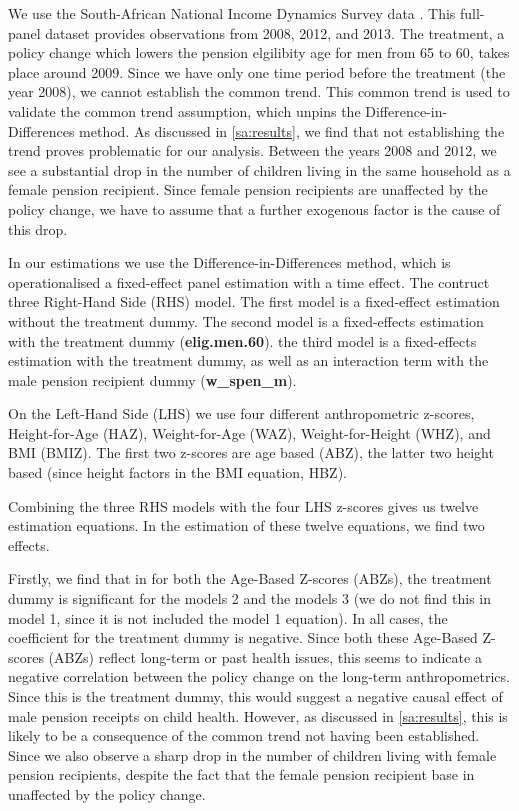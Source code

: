 \begin{refsection}
We use the South-African National Income Dynamics Survey data
\parencite[in collaboration with The World Bank]{saldru2008nids,saldru2012nids,saldru2013nids}.
This full-panel dataset provides observations from 2008, 2012, and 2013.
The treatment, a policy change which lowers the pension elgilibity age for men from 65 to 60, takes place around 2009.
Since we have only one time period before the treatment (the year 2008), we cannot establish the common trend.
This common trend is used to validate the common trend assumption, which unpins the Difference-in-Differences method.
As discussed in \autoref{sa:results}, we find that not establishing the trend proves problematic for our analysis.
Between the years 2008 and 2012,
we see a substantial drop in the number of children living in the same household as a female pension recipient.
Since female pension recipients are unaffected by the policy change, we have to assume that a further exogenous factor is the cause of this drop.

In our estimations we use the Difference-in-Differences method,
which is operationalised a fixed-effect panel estimation with a time effect.
The contruct three Right-Hand Side (RHS) model.
The first model is a fixed-effect estimation without the treatment dummy.
The second model is a fixed-effects estimation with the treatment dummy (\textbf{elig.men.60}).
the third model is a fixed-effects estimation with the treatment dummy,
as well as an interaction term with the male pension recipient dummy (\textbf{w\_spen\_m}).

On the Left-Hand Side (LHS) we use four different anthropometric z-scores,
Height-for-Age (HAZ), Weight-for-Age (WAZ), Weight-for-Height (WHZ), and BMI (BMIZ).
The first two z-scores are age based (ABZ), the latter two height based (since height factors in the BMI equation, HBZ).

Combining the three RHS models with the four LHS z-scores gives us twelve estimation equations.
In the estimation of these twelve equations, we find two effects.

Firstly, we find that in for both the Age-Based Z-scores (ABZs),
the treatment dummy is significant for the models 2 and the models 3
(we do not find this in model 1, since it is not included the model 1 equation).
In all cases, the coefficient for the treatment dummy is negative.
Since both these Age-Based Z-scores (ABZs) reflect long-term or past health issues,
this seems to indicate a negative correlation between the policy change on the long-term anthropometrics.
Since this is the treatment dummy, this would suggest a negative causal effect of male pension receipts on child health.
However, as discussed in \autoref{sa:results},
this is likely to be a consequence of the common trend not having been established.
Since we also observe a sharp drop in the number of children living with female pension recipients,
despite the fact that the female pension recipient base in unaffected by the policy change.


\end{refsection}

